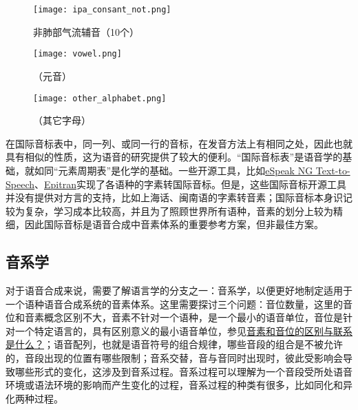 \documentclass[cn,10pt,math=newtx,citestyle=gb7714-2015,bibstyle=gb7714-2015]{elegantbook}
\begin{document}
\begin{figure}[htbp]
  \centering
  \texttt{[image: ipa\_consant\_not.png]}
  \caption{非肺部气流辅音（10个） \label{fig:ipa_consant_not}}
\end{figure}

\begin{figure}[htbp]
  \centering
  \texttt{[image: vowel.png]}
  \caption{（元音） \label{fig:vowel}}
\end{figure}

\begin{figure}[htbp]
  \centering
  \texttt{[image: other\_alphabet.png]}
  \caption{（其它字母） \label{fig:other_alphabet}}
\end{figure}

在国际音标表中，同一列、或同一行的音标，在发音方法上有相同之处，因此也就具有相似的性质，这为语音的研究提供了较大的便利。“国际音标表”是语音学的基础，就如同“元素周期表”是化学的基础。一些开源工具，比如\href{https://github.com/espeak-ng/espeak-ng}{eSpeak NG Text-to-Speech}、\href{https://github.com/dmort27/epitran}{Epitran}实现了各语种的字素转国际音标。但是，这些国际音标开源工具并没有提供对方言的支持，比如上海话、闽南语的字素转音素；国际音标本身识记较为复杂，学习成本比较高，并且为了照顾世界所有语种，音素的划分上较为精细，因此国际音标是语音合成中音素体系的重要参考方案，但非最佳方案。

\subsection{音系学}

对于语音合成来说，需要了解语言学的分支之一：音系学，以便更好地制定适用于一个语种语音合成系统的音素体系。这里需要探讨三个问题：音位数量，这里的音位和音素概念区别不大，音素不针对一个语种，是一个最小的语音单位，音位是针对一个特定语言的，具有区别意义的最小语音单位，参见\href{https://www.zhihu.com/question/27250496}{音素和音位的区别与联系是什么？}；语音配列，也就是语音符号的组合规律，哪些音段的组合是不被允许的，音段出现的位置有哪些限制；音系交替，音与音同时出现时，彼此受影响会导致哪些形式的变化，这涉及到音系过程。音系过程可以理解为一个音段受所处语音环境或语法环境的影响而产生变化的过程，音系过程的种类有很多，比如同化和异化两种过程。
\end{document}

